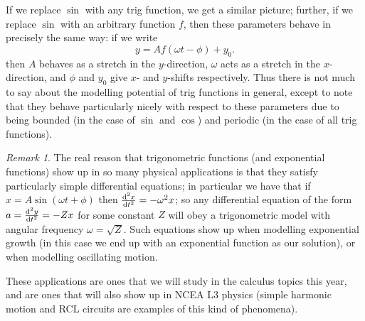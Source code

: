 \documentclass[a4paper,leqno]{article}
\numberwithin{equation}{section}
\theoremstyle{definition}
\theoremstyle{remark}
\newtheorem{rem}[equation]{Remark}
\begin{document}
\begin{center}
\end{center}

If we replace $ \sin $ with any trig function, we get a similar picture; further, if we replace $ \sin $
with an arbitrary function $ f $, then these parameters behave in precisely the same way: if we write
\begin{equation}
  y = Af(\omega t - \phi) + y_0.
\end{equation}
then $ A $ behaves as a stretch in the $ y$-direction, $ \omega $ acts as a stretch in the $ x$-direction,
and $ \phi $ and $ y_0 $ give $ x$- and $ y$-shifts respectively. Thus there is not much to say about
the modelling potential of trig functions in general, except to note that they behave particularly nicely
with respect to these parameters due to being bounded (in the case of $ \sin $ and $ \cos $) and periodic
(in the case of all trig functions).

\begin{rem}
  The real reason that trigonometric functions (and exponential functions) show up in so many
  physical applications is that they satisfy particularly simple differential equations; in particular
  we have that if $ x = A\sin(\omega t + \phi) $ then $ \od[2]{x}{t} = -\omega^2 x $; so any differential
  equation of the form $ a = \od[2]{y}{t} = -Zx $ for some constant $ Z $ will obey a trigonometric
  model with angular frequency $ \omega = \sqrt{Z} $. Such equations show up when modelling exponential
  growth (in this case we end up with an exponential function as our solution), or when modelling oscillating
  motion.

  These applications are ones that we will study in the calculus topics this year, and are ones that will
  also show up in NCEA L3 physics (simple harmonic motion and RCL circuits are examples of this kind of phenomena).
\end{rem}
\end{document}
